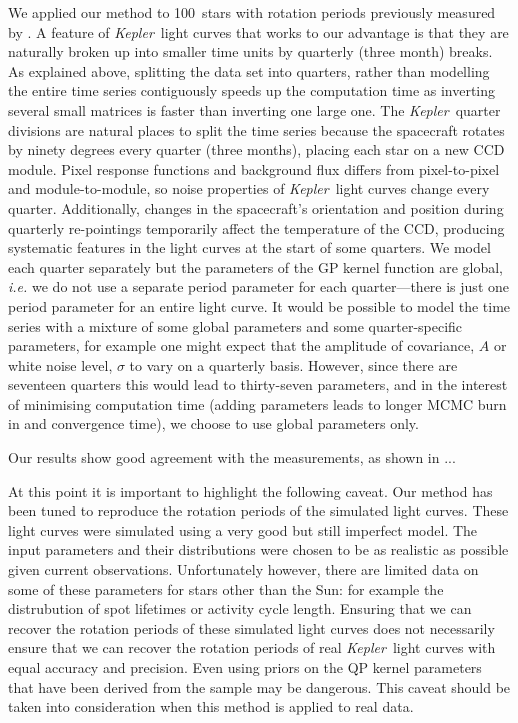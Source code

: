 \documentclass[useAMS, usenatbib, preprint, 12pt]{aastex}
\newcommand{\nmcquillan}{100}
\newcommand{\Kepler}{{\it Kepler}}
\newcommand{\kepler}{\Kepler}
\begin{document}
We applied our method to \nmcquillan\ stars with rotation periods previously
measured by \citet{Mcquillan2014}.
A feature of \kepler\ light curves that works to our advantage is that they
are naturally broken up into smaller time units by quarterly (three month)
breaks.
As explained above, splitting the data set into quarters, rather than
modelling the entire time series contiguously speeds up the computation time
as inverting several small matrices is faster than inverting one large one.
The \kepler\ quarter divisions are natural places to split the time series
because the spacecraft rotates by ninety degrees every quarter (three months),
placing each star on a new CCD module.
Pixel response functions and background flux differs from pixel-to-pixel and
module-to-module, so noise properties of \kepler\ light curves change every
quarter.
Additionally, changes in the spacecraft's orientation and position during
quarterly re-pointings temporarily affect the temperature of the CCD,
producing systematic features in the light curves at the start of some
quarters.
We model each quarter separately but the parameters of the GP kernel function
are global, {\it i.e.} we do not use a separate period parameter for each
quarter---there is just one period parameter for an entire light curve.
It would be possible to model the time series with a mixture of some global
parameters and some quarter-specific parameters, for example one might expect
that the amplitude of covariance, $A$ or white noise level, $\sigma$ to vary
on a quarterly basis.
However, since there are seventeen quarters this would lead to thirty-seven
parameters, and in the interest of minimising computation time (adding
parameters leads to longer MCMC burn in and convergence time), we choose to
use global parameters only.

Our results show good agreement with the \citet{Mcquillan2014} measurements,
as shown in ... %

At this point it is important to highlight the following caveat.
Our method has been tuned to reproduce the rotation periods of the
\citet{Aigrain2015} simulated light curves.
These light curves were simulated using a very good but still imperfect model.
The input parameters and their distributions were chosen to be as realistic as
possible given current observations.
Unfortunately however, there are limited data on some of these parameters for
stars other than the Sun: for example the distrubution of spot lifetimes or
activity cycle length.
Ensuring that we can recover the rotation periods of these simulated light
curves does not necessarily ensure that we can recover the rotation periods of
real \kepler\ light curves with equal accuracy and precision.
Even using priors on the QP kernel parameters that have been derived from the
\citet{Aigrain2015} sample may be dangerous.
This caveat should be taken into consideration when this method is applied to
real data.
\end{document}
